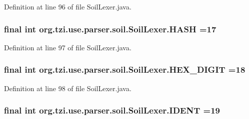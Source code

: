 Definition at line 96 of file Soil\-Lexer.\-java.

\hypertarget{classorg_1_1tzi_1_1use_1_1parser_1_1soil_1_1_soil_lexer_af5902e08572a7ca01680d184f4dee867}{
\subsubsection[{H\-A\-S\-H}]{\setlength{\rightskip}{0pt plus 5cm}final int org.\-tzi.\-use.\-parser.\-soil.\-Soil\-Lexer.\-H\-A\-S\-H =17\hspace{0.3cm}{\ttfamily [static]}}}\label{classorg_1_1tzi_1_1use_1_1parser_1_1soil_1_1_soil_lexer_af5902e08572a7ca01680d184f4dee867}


Definition at line 97 of file Soil\-Lexer.\-java.

\hypertarget{classorg_1_1tzi_1_1use_1_1parser_1_1soil_1_1_soil_lexer_a4539b5c7a416bf74a6361394262b3467}{
\subsubsection[{H\-E\-X\-\_\-\-D\-I\-G\-I\-T}]{\setlength{\rightskip}{0pt plus 5cm}final int org.\-tzi.\-use.\-parser.\-soil.\-Soil\-Lexer.\-H\-E\-X\-\_\-\-D\-I\-G\-I\-T =18\hspace{0.3cm}{\ttfamily [static]}}}\label{classorg_1_1tzi_1_1use_1_1parser_1_1soil_1_1_soil_lexer_a4539b5c7a416bf74a6361394262b3467}


Definition at line 98 of file Soil\-Lexer.\-java.

\hypertarget{classorg_1_1tzi_1_1use_1_1parser_1_1soil_1_1_soil_lexer_a6d03f5d1151f8798e0f3d8d40fe79575}{
\subsubsection[{I\-D\-E\-N\-T}]{\setlength{\rightskip}{0pt plus 5cm}final int org.\-tzi.\-use.\-parser.\-soil.\-Soil\-Lexer.\-I\-D\-E\-N\-T =19\hspace{0.3cm}{\ttfamily [static]}}}\label{classorg_1_1tzi_1_1use_1_1parser_1_1soil_1_1_soil_lexer_a6d03f5d1151f8798e0f3d8d40fe79575}


